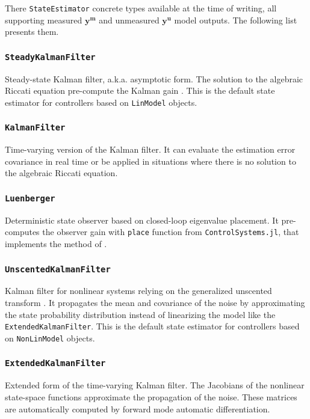There  \texttt{StateEstimator} concrete types available at the time of writing, all supporting measured $\mathbf{y^m}$ and unmeasured $\mathbf{y^u}$ model outputs. The following list presents them.

\subsubsection{\textnormal{\texttt{SteadyKalmanFilter}}}
Steady-state Kalman filter, a.k.a. asymptotic form. The solution to the algebraic Riccati equation pre-compute the Kalman gain \citep{simon}. This is the default state estimator for controllers based on \texttt{LinModel} objects.

\subsubsection{\textnormal{\texttt{KalmanFilter}}}
Time-varying version of the Kalman filter. It can evaluate the estimation error covariance in real time or be applied in situations where there is no solution to the algebraic Riccati equation.

\subsubsection{\textnormal{\texttt{Luenberger}}}
Deterministic state observer based on closed-loop eigenvalue placement. It pre-computes the observer gain with \texttt{place} function from \texttt{ControlSystems.jl}, that implements the method of \citet{placePoles}.

\subsubsection{\textnormal{\texttt{UnscentedKalmanFilter}}}
Kalman filter for nonlinear systems relying on the generalized unscented transform \citep{simon}. It propagates the mean and covariance of the noise by approximating the state probability distribution instead of linearizing the model like the \texttt{ExtendedKalmanFilter}. This is the default state estimator for controllers based on \texttt{NonLinModel} objects.

\subsubsection{\textnormal{\texttt{ExtendedKalmanFilter}}}
Extended form of the time-varying Kalman filter. The Jacobians of the nonlinear state-space functions approximate the propagation of the noise. These matrices are automatically computed by forward mode automatic differentiation.

